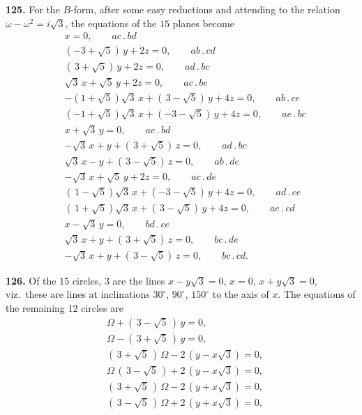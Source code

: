\documentclass[11pt]{article}
\newcommand{\artno}[1]{\textbf{#1.}\quad}
\begin{document}
\medskip
\noindent
\artno{125} For the $B$-form, after some easy reductions and attending to
the relation $\omega - \omega^{2} = i\sqrt{3}$, the equations of the $15$
planes become
\begin{align*}
  &x = 0,\qquad ac\,.\,bd\\
  &(-3 + \sqrt{5})\,y + 2z = 0,\qquad ab\,.\,cd\\
  &(\,3 + \sqrt{5})\,y + 2z = 0,\qquad ad\,.\,bc\\
  &\sqrt{3}\,x + \sqrt{5}\,y + 2z = 0,\qquad ac\,.\,be\\
  &-(1 + \sqrt{5})\sqrt{3}\,x + (\,3 - \sqrt{5})\,y + 4z = 0,\qquad ab\,.\,ce\\
  &(-1 + \sqrt{5})\sqrt{3}\,x + (-3 - \sqrt{5})\,y + 4z = 0,\qquad ae\,.\,bc\\
  &x + \sqrt{3}\,y = 0,\qquad ae\,.\,bd\\
  &-\sqrt{3}\,x + y + (\,3 + \sqrt{5})\,z = 0,\qquad ad\,.\,bc\\
  &\sqrt{3}\,x - y + (\,3 - \sqrt{5})\,z = 0,\qquad ab\,.\,de\\
  &-\sqrt{3}\,x + \sqrt{5}\,y + 2z = 0,\qquad ac\,.\,de\\
  &(\,1 - \sqrt{5})\sqrt{3}\,x + (-3 - \sqrt{5})\,y + 4z = 0,\qquad ad\,.\,ce\\
  &(\,1 + \sqrt{5})\sqrt{3}\,x + (\,3 - \sqrt{5})\,y + 4z = 0,\qquad ae\,.\,cd\\
  &x - \sqrt{3}\,y = 0,\qquad bd\,.\,ce\\
  &\sqrt{3}\,x + y + (\,3 + \sqrt{5})\,z = 0,\qquad bc\,.\,de\\
  &-\sqrt{3}\,x + y + (\,3 - \sqrt{5})\,z = 0,\qquad bc\,.\,cd.
\end{align*}

\medskip
\noindent
\artno{126} Of the $15$ circles, $3$ are the lines $x - y\sqrt{3} = 0$,
$x = 0$, $x + y\sqrt{3} = 0$, viz.\ these are lines at inclinations
$30^{\circ}$, $90^{\circ}$, $150^{\circ}$ to the axis of $x$. The equations
of the remaining $12$ circles are
\begin{align*}
  &\Omega + (\,3 - \sqrt{5}\,)\,y = 0,\\
  &\Omega - (\,3 + \sqrt{5}\,)\,y = 0,\\
  &(\,3 + \sqrt{5}\,)\,\Omega - 2\,(y - x\sqrt{3}) = 0,\\
  &\Omega\,(\,3 - \sqrt{5}\,) + 2\,(y - x\sqrt{3}) = 0,\\
  &(\,3 + \sqrt{5}\,)\,\Omega - 2\,(y + x\sqrt{3}) = 0,\\
  &(\,3 - \sqrt{5}\,)\,\Omega + 2\,(y + x\sqrt{3}) = 0,\\
\end{align*}
\end{document}
